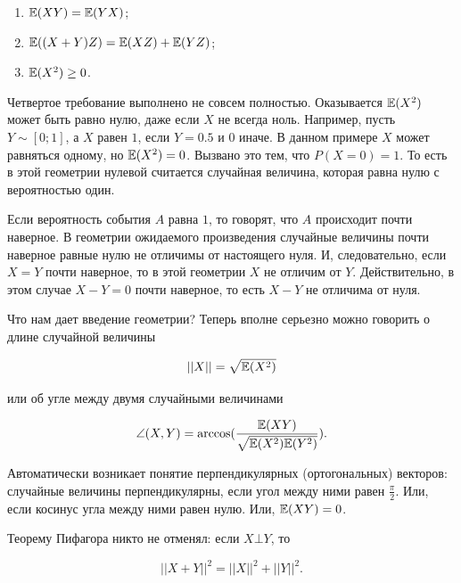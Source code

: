 \documentclass[12pt, a4paper, oneside]{article}
\begin{document}
\begin{enumerate} 
\item $\mathbb{E}(XY)=\mathbb{E}(YX)$;
\item $\mathbb{E}((X+Y)Z)=\mathbb{E}(XZ)+\mathbb{E}(YZ)$;
\item $\mathbb{E}(X^2)\ge 0$.
\end{enumerate} 

Четвертое требование выполнено не совсем полностью. Оказывается $\mathbb{E}(X^2)$ может быть равно нулю, даже если $X$ не всегда ноль. Например, пусть $Y \sim [0;1]$, а $X$ равен $1$, если $Y=0.5$ и $0$ иначе. В данном примере $X$ может равняться одному, но  $\mathbb{E}(X^{2})=0$. Вызвано это тем, что $P(X=0)=1$. То есть в этой геометрии нулевой считается случайная величина, которая равна нулю с вероятностью один. 

Если вероятность события $A$ равна $1$, то говорят, что $A$ происходит почти наверное. В геометрии ожидаемого произведения случайные величины почти наверное равные нулю не отличимы от настоящего нуля. И, следовательно, если $X=Y$ почти наверное, то в этой геометрии $X$ не отличим от $Y$. Действительно, в этом случае $X-Y=0$ почти наверное, то есть $X-Y$ не отличима от нуля.

Что нам дает введение геометрии? Теперь вполне серьезно можно говорить о длине случайной величины 

$$||X||=\sqrt{\mathbb{E}(X^{2})}$$ 

или об угле между двумя случайными величинами

$$\angle(X,Y)=\arccos(\frac{\mathbb{E}(XY)}{\sqrt{\mathbb{E}(X^{2})\mathbb{E}(Y^{2})}}).$$

Автоматически возникает понятие перпендикулярных (ортогональных) векторов: случайные величины перпендикулярны, если угол между ними равен $\frac{\pi}{2}$. Или, если косинус угла между ними равен нулю. Или, $\mathbb{E}(XY)=0$.

\begin{center} 
\end{center} 

Теорему Пифагора никто не отменял: если $X \bot Y$, то

$$||X+Y||^{2}=||X||^{2}+||Y||^{2}.$$
\end{document}
